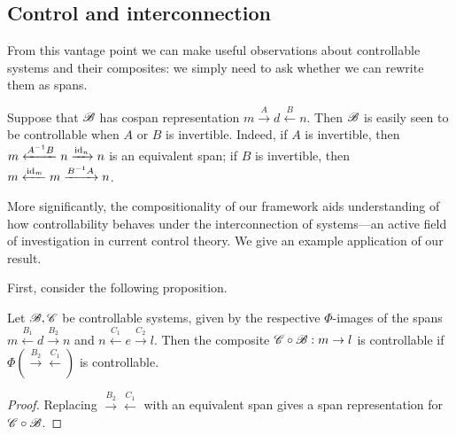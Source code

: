 
\subsection{Control and interconnection}
From this vantage point we can make useful observations about controllable
systems and their composites: we simply need to ask whether we can rewrite them
as spans. 

\begin{example}
  Suppose that ${\mathscr B}$ has cospan representation
    $m \xrightarrow{A} d \xleftarrow{B} n.$
  Then ${\mathscr B}$ is easily seen to be controllable when $A$ or $B$ is invertible.
  Indeed, if $A$ is invertible, then $m  \xleftarrow{A^{-1}B} n
  \xrightarrow{\mathrm{id}_n} n$ is an equivalent span; if $B$ is invertible, then
  $m\xleftarrow{\mathrm{id}_m} m \xrightarrow{B^{-1}A} n$.
\end{example}

More significantly, the compositionality of our framework aids understanding of
how controllability behaves under the interconnection of systems---an active
field of investigation in current control theory. We give an example application
of our result.

First, consider the following proposition.
\begin{proposition}\label{prop:veryexciting}
  Let ${\mathscr B},\mathscr{C}$ be controllable systems, given by the respective
  $\Phi$-images of the spans
    $m \xleftarrow{B_1} d \xrightarrow{B_2} n$ %
    and %
    $n \xleftarrow{C_1} e \xrightarrow{C_2} l$.
  Then the composite $\mathscr{C} \circ {\mathscr B}: m \to l$ is controllable
  if $\Phi(\xrightarrow{B_2}\xleftarrow{C_1})$ is
  controllable.
\end{proposition}
\begin{proof}
  Replacing $\xrightarrow{B_2}\xleftarrow{C_1}$ with an equivalent span gives a span
  representation for $\mathscr{C} \circ {\mathscr B}$.
\end{proof}

